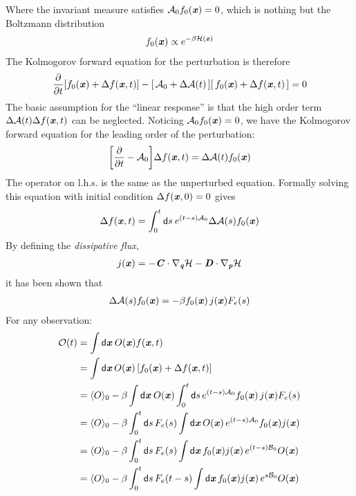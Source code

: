 \documentclass[aip,jcp,a4paper,reprint,onecolumn]{revtex4-1}
\newcommand{\vect}[1]{\textbf{\textit{#1}}}
\newcommand{\dd}{\textsf{d}}
\newcommand{\mh}{\mathcal H}
\newcommand{\fwg}{{\mathcal A}}
\newcommand{\bwg}{{\mathcal B}}
\begin{document}
Where the invariant measure satisfies $\fwg_0f_0(\vect x) = 0$,
which is nothing but the Boltzmann distribution
\begin{align}
  f_0(\vect x) \propto e^{-\beta\mh(\vect x)}
\end{align}
The Kolmogorov forward equation for the perturbation is therefore
\begin{align}
  \frac{\partial}{\partial t}
  [f_0(\vect x) + \Delta  f(\vect x, t)]
  -
  [\,\fwg_0 + \Delta\fwg(t)\,]
  [\,f_0(\vect x) + \Delta  f(\vect x, t)\,] = 0
\end{align}
The basic assumption for the ``linear response'' is that the high order
term $\Delta\fwg(t)  \Delta  f(\vect x, t)$ 
can be neglected. Noticing $\fwg_0 f_0(\vect x) = 0$, we have the
Kolmogorov forward equation
for the leading order of the perturbation:
\begin{align}
  \bigg[
  \frac{\partial}{\partial t}
  - \fwg_0
  \bigg]
  \Delta  f(\vect x, t)
  =
  \Delta\fwg(t) f_0(\vect x)
\end{align}
The operator on l.h.s. is the same as the unperturbed equation.
Formally solving this equation with initial condition
$\Delta f(\vect x, 0) = 0$ gives
\begin{align}
  \Delta  f(\vect x, t) =
  \int_0^t \dd s \:
  e^{(t-s)\fwg_0}
  \Delta\fwg(s)f_0(\vect x)
\end{align}
By defining the \emph{dissipative flux},
\begin{align}
  j(\vect x) =
  -\vect C\cdot\nabla_{\vect q}\mh 
  -\vect D\cdot\nabla_{\vect p}\mh
\end{align}
it has been shown that %
\begin{align}
  \Delta\fwg(s)f_0(\vect x) =
  -\beta f_0(\vect x)\, j(\vect x) F_e(s)
\end{align}
For any observation:
\begin{align}\nonumber
  \mathcal O(t)
  &=
  \int\dd \vect x \:O(\vect x)f(\vect x, t)  \\\nonumber
  &=
  \int\dd \vect x\, O(\vect x)\,
  [f_0(\vect x) + \Delta f(\vect x, t)] \\\nonumber
  &=
  \langle O\rangle_0
  -
  \beta
  \int \dd \vect x\:
  O(\vect x)
  \int_0^t\dd s\,
  e^{(t-s)\fwg_0}
  f_0(\vect x)\, j(\vect x)F_e(s)  \\\nonumber
  &=
  \langle O\rangle_0
  -
  \beta
  \int_0^t\dd s\,
  F_e(s)
  \int \dd \vect x\,
  O(\vect x)\,
  e^{(t-s)\fwg_0}
  f_0(\vect x) j(\vect x)  \\\nonumber
  &=
  \langle O\rangle_0
  -
  \beta
  \int_0^t\dd s\,
  F_e(s)
  \int \dd \vect x\,
  f_0(\vect x) j(\vect x)\,
  e^{(t-s)\bwg_0}
  O(\vect x)\\
  &=
  \langle O\rangle_0
  -
  \beta
  \int_0^t\dd s\,
  F_e(t-s)
  \int \dd \vect x\,
  f_0(\vect x) j(\vect x)\,
  e^{s\bwg_0}
  O(\vect x)
\end{align}
\end{document}
